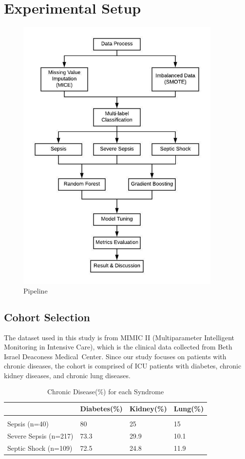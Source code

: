 \documentclass[twoside,11pt]{article}
\begin{document}
\section{Experimental Setup}
\begin{figure}[!htbp]
	\centering 
	\includegraphics[width=4in]{Pipeline.jpeg} 
	\caption{Pipeline}
	\label{fig:example} 
\end{figure} 
\subsection{Cohort Selection}
The dataset used in this study is from MIMIC II (Multiparameter Intelligent Monitoring in Intensive Care), which is the clinical data collected from Beth Israel Deaconess Medical Center.
Since our study focuses on patients with chronic diseases, the cohort is comprised of ICU patients with diabetes, chronic kidney diseases, and chronic lung diseases.

\begin{table}[htbp]
	\centering 
	\begin{tabular}{|p{4cm}|p{2cm}|p{2cm}|p{2cm}|}
		\hline 
		& Diabetes(\%) & Kidney(\%) & Lung(\%)\\ 
		\hline \\[-11pt]
		Sepsis (n=40) & 80 &  25 & 15 \\ 
		Severe Sepsis (n=217) & 73.3 &  29.9 & 10.1\\
		Septic Shock (n=109) & 72.5 & 24.8 & 11.9\\
		\hline 
	\end{tabular}
	\label{tab:example} 
	\caption{Chronic Disease(\%) for each Syndrome} 
\end{table}
\end{document}
